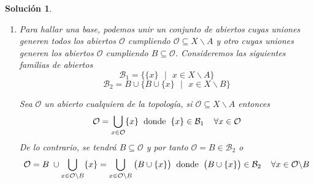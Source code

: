 \documentclass{article}
\newcommand{\closure}[1]{\mkern
  1.5mu\overline{\mkern-1.5mu#1\mkern-1.5mu}\mkern 1.5mu}
\newcommand{\interior}[1]{{\kern0pt#1}^{\mathrm{o}}}
\theoremstyle{remark,bold} \newtheorem{exercise}{Ejercicio}
\newtheorem*{solution}{Solución}
\begin{document}
\begin{solution}
\begin{enumerate}
    Si $A = B$, $A$ es abierto y cerrado a la vez, luego su frontera
    es vacía.
    $$Fr(A) = \closure{A} \backslash \interior{A} = A \backslash A =
    \emptyset$$

    De lo contrario su frontera es el propio $A$ \vspace{-4mm}

    $$Fr(A) = \closure{A} \backslash \interior{A} = A \backslash \emptyset =
    A$$

    $B \subseteq B$, por lo que $B$ es abierto en la topología y se
    tiene $\interior{B} = B$.
    
    Como $A \subseteq B$, se tiene $X \backslash B \subseteq X
    \backslash A$, por lo que el complementario de $B$ es abierto y se da
    $\closure{B} = B$.

    $B$ es abierto y cerrado a la vez, por lo que su frontera es vacía
    \vspace{-4mm}
    
    $$Fr(B) = \closure{B} \backslash \interior{B} = B \backslash B =
    \emptyset$$

  \item Para hallar una base, podemos unir un conjunto de abiertos
    cuyas uniones generen todos los abiertos $\mathcal{O}$ cumpliendo
    $\mathcal{O} \subseteq X \backslash A$ y otro cuyas uniones generen
    los abiertos $\mathcal{O}$ cumpliendo $B \subseteq
    \mathcal{O}$. Consideremos las siguientes familias de abiertos
    \[\mathcal{B}_1 = \big\{\{x\} \text{ } | \text{ } x \in X
      \backslash A\big\}\]
    \[\mathcal{B}_2 = B \cup \big\{B \cup \{x\} \text{ } | \text{ } x
      \in X \backslash B\big\} \]

    Sea $\mathcal{\mathcal{O}}$ un abierto cualquiera de la topología,
    si $\mathcal{\mathcal{O}} \subseteq X \backslash A$ entonces
    \[\mathcal{\mathcal{O}} = \bigcup\limits_{x \in
        \mathcal{\mathcal{O}}}\{x\} \hspace{2mm} \text{donde} \hspace{2mm}
      \{x\} \in \mathcal{B}_1 \hspace{4mm} \forall x \in
      \mathcal{\mathcal{O}} \vspace{-1mm}\] De lo contrario, se tendrá $B
    \subseteq \mathcal{\mathcal{O}}$ y por tanto $\mathcal{\mathcal{O}} =
    B \in \mathcal{B}_2$ o
    \[\mathcal{\mathcal{O}} = B \hspace{1mm} \cup \bigcup\limits_{x
        \in \mathcal{\mathcal{O}} \backslash B}\{x\} = \bigcup\limits_{x \in
        \mathcal{\mathcal{O}} \backslash B} \big(B \cup \{x\}\big)
      \hspace{2mm} \text{donde} \hspace{2mm} \big(B \cup \{x\}\big) \in
      \mathcal{B}_2 \hspace{4mm} \forall x \in \mathcal{\mathcal{O}}
      \backslash B\]


\end{enumerate}
\end{solution}
\end{document}
